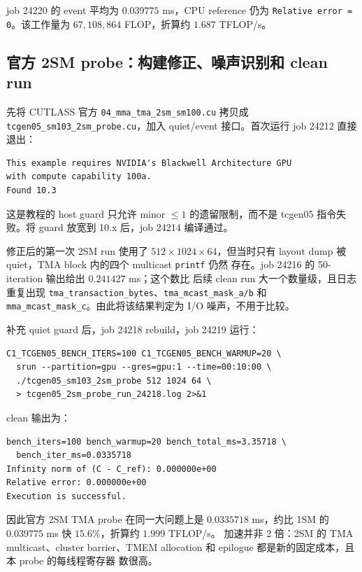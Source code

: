\documentclass[11pt,a4paper,fontset=none]{ctexart}
\newcommand{\code}[1]{\texttt{#1}}
\begin{document}
job 24220 的 event 平均为 \(0.039775\) ms，CPU reference 仍为
\code{Relative error = 0}。该工作量为 \(67,108,864\) FLOP，折算约
\(1.687\) TFLOP/s。

\subsection{官方 2SM probe：构建修正、噪声识别和 clean run}

先将 CUTLASS 官方
\code{04\_mma\_tma\_2sm\_sm100.cu} 拷贝成
\code{tcgen05\_sm103\_2sm\_probe.cu}，加入 quiet/event 接口。首次运行
job 24212 直接退出：

\begin{lstlisting}
This example requires NVIDIA's Blackwell Architecture GPU
with compute capability 100a.
Found 10.3
\end{lstlisting}

这是教程的 host guard 只允许 minor \(\leq1\) 的遗留限制，而不是
tcgen05 指令失败。将 guard 放宽到 10.x 后，job 24214 编译通过。

修正后的第一次 2SM run 使用了 \(512\times1024\times64\)，但当时只有
layout dump 被 quiet，TMA block 内的四个 multicast \code{printf} 仍然
存在。job 24216 的 50-iteration 输出给出 \(0.241427\) ms；这个数比
后续 clean run 大一个数量级，且日志重复出现
\code{tma\_transaction\_bytes}、\code{tma\_mcast\_mask\_a/b} 和
\code{mma\_mcast\_mask\_c}。由此将该结果判定为 I/O 噪声，不用于比较。

补充 quiet guard 后，job 24218 rebuild，job 24219 运行：

\begin{lstlisting}
C1_TCGEN05_BENCH_ITERS=100 C1_TCGEN05_BENCH_WARMUP=20 \
  srun --partition=gpu --gres=gpu:1 --time=00:10:00 \
  ./tcgen05_sm103_2sm_probe 512 1024 64 \
  > tcgen05_2sm_probe_run_24218.log 2>&1
\end{lstlisting}

clean 输出为：

\begin{lstlisting}
bench_iters=100 bench_warmup=20 bench_total_ms=3.35718 \
  bench_iter_ms=0.0335718
Infinity norm of (C - C_ref): 0.000000e+00
Relative error: 0.000000e+00
Execution is successful.
\end{lstlisting}

因此官方 2SM TMA probe 在同一大问题上是 \(0.0335718\) ms，约比
1SM 的 \(0.039775\) ms 快 \(15.6\%\)，折算约 \(1.999\) TFLOP/s。
加速并非 2 倍：2SM 的 TMA multicast、cluster barrier、TMEM
allocation 和 epilogue 都是新的固定成本，且本 probe 的每线程寄存器
数很高。
\end{document}
